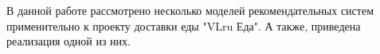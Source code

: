 В данной работе рассмотрено несколько моделей рекомендательных систем применительно
к проекту доставки еды "VLru Еда". А также, приведена реализация одной из них.

